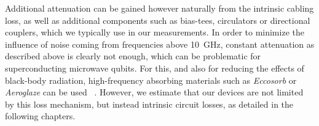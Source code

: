 Additional attenuation can be gained however naturally from the intrinsic cabling loss, as well as additional components such as bias-tees, circulators or directional couplers, which we typically use in our measurements.
%
In order to minimize the influence of noise coming from frequencies above \SI{10}{\giga\hertz}, constant attenuation as described above is clearly not enough, which can be problematic for superconducting microwave qubits.
%
For this, and also for reducing the effects of black-body radiation, high-frequency absorbing materials such as \textit{Eccosorb} or \textit{Aeroglaze} can be used~ \cite{perskyReviewBlackSurfaces1999,barendsMinimizingQuasiparticleGeneration2011,baselmansUltraLowBackground2012,vanwoerkomOneMinuteParity2015,krinnerEngineeringCryogenicSetups2019}.
%
However, we estimate that our devices are not limited by this loss mechanism, but instead intrinsic circuit losses, as detailed in the following chapters.